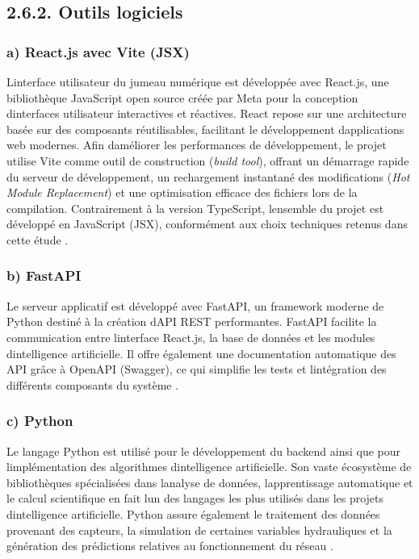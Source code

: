 \documentclass[12pt,a4paper,oneside]{report}
\begin{document}
\subsection{\texorpdfstring{\textbf{2.6.2. Outils
logiciels}}{2.6.2. Outils logiciels}}\label{outils-logiciels}

\subsubsection{a) React.js avec Vite
(JSX)}\label{a-react.js-avec-vite-jsx}

L\textquotesingle interface utilisateur du jumeau numérique est
développée avec React.js, une bibliothèque JavaScript open source créée
par Meta pour la conception d\textquotesingle interfaces utilisateur
interactives et réactives. React repose sur une architecture basée sur
des composants réutilisables, facilitant le développement
d\textquotesingle applications web modernes. Afin
d\textquotesingle améliorer les performances de développement, le projet
utilise Vite comme outil de construction (\emph{build tool}), offrant un
démarrage rapide du serveur de développement, un rechargement instantané
des modifications (\emph{Hot Module Replacement}) et une optimisation
efficace des fichiers lors de la compilation. Contrairement à la version
TypeScript, l\textquotesingle ensemble du projet est développé en
JavaScript (JSX), conformément aux choix techniques retenus dans cette
étude \cite{ref115}.

\subsubsection{b) FastAPI}\label{b-fastapi}

Le serveur applicatif est développé avec FastAPI, un framework moderne
de Python destiné à la création d\textquotesingle API REST performantes.
FastAPI facilite la communication entre l\textquotesingle interface
React.js, la base de données et les modules
d\textquotesingle intelligence artificielle. Il offre également une
documentation automatique des API grâce à OpenAPI (Swagger), ce qui
simplifie les tests et l\textquotesingle intégration des différents
composants du système \cite{ref116}.

\subsubsection{c) Python}\label{c-python}

Le langage Python est utilisé pour le développement du backend ainsi que
pour l\textquotesingle implémentation des algorithmes
d\textquotesingle intelligence artificielle. Son vaste écosystème de
bibliothèques spécialisées dans l\textquotesingle analyse de données,
l\textquotesingle apprentissage automatique et le calcul scientifique en
fait l\textquotesingle un des langages les plus utilisés dans les
projets d\textquotesingle intelligence artificielle. Python assure
également le traitement des données provenant des capteurs, la
simulation de certaines variables hydrauliques et la génération des
prédictions relatives au fonctionnement du réseau \cite{ref117}.
\end{document}
